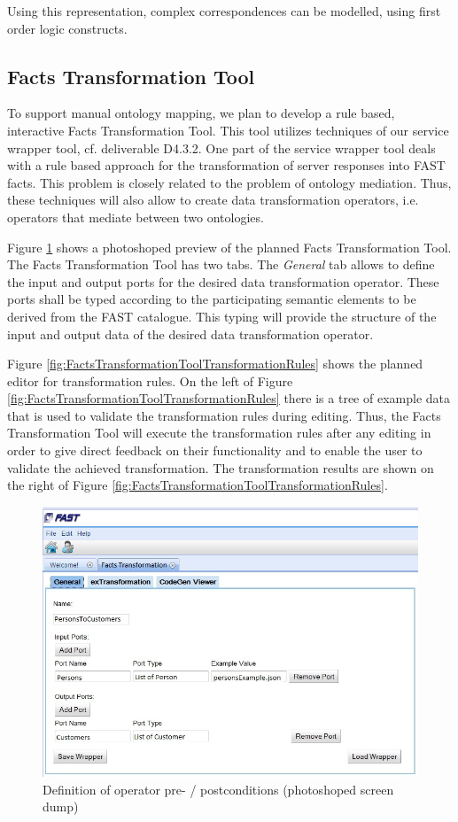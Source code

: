 Using this representation, complex correspondences can be modelled, using first order logic constructs.

\subsection{Facts Transformation Tool}

To support manual ontology mapping, we plan to develop a rule based, interactive Facts Transformation Tool. This tool utilizes techniques of our service wrapper tool, cf. deliverable D4.3.2. One part of the service wrapper tool deals with a rule based approach for the transformation of server responses into FAST facts. This problem is closely related to the problem of ontology mediation. Thus, these techniques will also allow to create data transformation operators, i.e. operators that mediate between two ontologies.

Figure \ref{fig:FactsTransformationToolPortDefinitions} shows a photoshoped preview of the planned Facts Transformation Tool. The Facts Transformation Tool has two tabs. The \textit{General} tab allows to define the input and output ports for the desired data transformation operator. These ports shall be  typed according to the participating semantic elements to be derived from the FAST catalogue. This typing will provide the structure of the input and output data of the desired data transformation operator.  

Figure \ref{fig:FactsTransformationToolTransformationRules} shows the planned editor for transformation rules. On the left of Figure \ref{fig:FactsTransformationToolTransformationRules} there is a tree of example data that is used to validate the transformation rules during editing. Thus, the Facts Transformation Tool will execute the transformation rules after any editing in order to give direct feedback on their functionality and to enable the user to validate the achieved transformation. The transformation results are shown on the right of Figure \ref{fig:FactsTransformationToolTransformationRules}. 


\begin{figure}
  \begin{center}
\includegraphics[width=0.8\linewidth]{images/FactsTransformationToolGVSWithPortDefinitionsNoGlitch2.png}
    \caption{Definition of operator pre- / postconditions (photoshoped screen dump)}
    \label{fig:FactsTransformationToolPortDefinitions}
  \end{center}
\end{figure}


